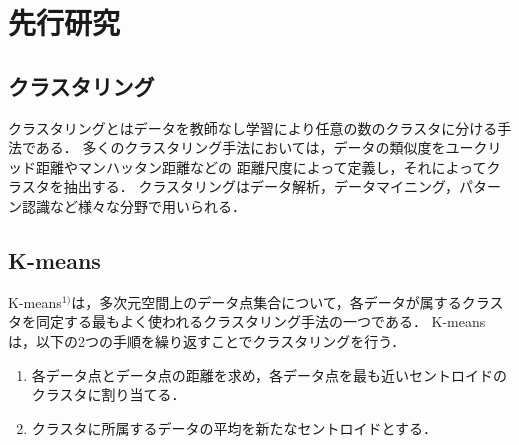 \section{先行研究}

\subsection{クラスタリング}
クラスタリングとはデータを教師なし学習により任意の数のクラスタに分ける手法である．
多くのクラスタリング手法においては，データの類似度をユークリッド距離やマンハッタン距離などの
距離尺度によって定義し，それによってクラスタを抽出する．
クラスタリングはデータ解析，データマイニング，パターン認識など様々な分野で用いられる．

\subsection{K-means}
K-means$^{1)}$は，多次元空間上のデータ点集合について，各データが属するクラスタを同定する最もよく使われるクラスタリング手法の一つである．
K-meansは，以下の2つの手順を繰り返すことでクラスタリングを行う．
\begin{enumerate}
  \item 各データ点とデータ点の距離を求め，各データ点を最も近いセントロイドのクラスタに割り当てる．
  \item クラスタに所属するデータの平均を新たなセントロイドとする．
\end{enumerate}

% 
% 

